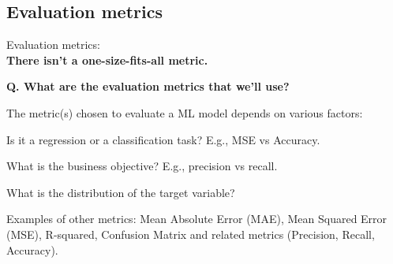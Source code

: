 \subsection{Evaluation metrics}
\begin{transitionsubframe}
  \begin{center}
    \Huge Evaluation metrics:\\\textbf{There isn't a one-size-fits-all metric.}
  \end{center}
\end{transitionsubframe}

\begin{frame}[fragile]{\textbf{Q. What are the evaluation metrics that we'll use?}}
\begin{wideitemize}
  \item The metric(s) chosen to evaluate a ML model depends on various factors:\medskip
  \begin{wideitemize}
    \item Is it a regression or a classification task? E.g., MSE vs Accuracy.
    \item What is the business objective? E.g., precision vs recall.
    \item What is the distribution of the target variable?
  \end{wideitemize}
  \item Examples of other metrics: Mean Absolute Error (MAE), Mean Squared Error
    (MSE), R-squared, Confusion Matrix and related metrics (Precision, Recall, Accuracy).
\end{wideitemize}
\end{frame}



